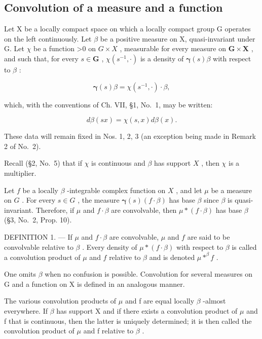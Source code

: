 \subsection{Convolution of a measure and a function}

Let X be a locally compact space on which a locally compact group G operates on the left continuously. Let \(\beta\) be a positive measure on X, quasi-invariant under G. Let \(\chi\) be a function \textgreater0 on \(G \times X\) , measurable for every measure on \(\mathbf{G} \times \mathbf{X}\) , and such that, for every \(s \in \mathbf{G}\) , \(\chi(s^{-1}, \cdot)\) is a density of \(\pmb{\gamma}(s)\beta\) with respect to \(\beta\) :

\[
\pmb {\gamma} (s) \beta = \chi (s ^ {- 1}, \cdot) \cdot \beta ,\tag{1}
\]

which, with the conventions of Ch. VII, §1, No.~1, may be written:

\[
d \beta (s x) = \chi (s, x) d \beta (x).\tag{1'}
\]

These data will remain fixed in Nos. 1, 2, 3 (an exception being made in Remark 2 of No.~2).

Recall (§2, No.~5) that if \(\chi\) is continuous and \(\beta\) has support \(X\) , then \(\chi\) is a multiplier.

Let \(f\) be a locally \(\beta\) -integrable complex function on \(X\) , and let \(\mu\) be a measure on \(G\) . For every \(s \in G\) , the measure \(\boldsymbol{\gamma}(s)(f \cdot \beta)\) has base \(\beta\) since \(\beta\) is quasi-invariant. Therefore, if \(\mu\) and \(f \cdot \beta\) are convolvable, then \(\mu * (f \cdot \beta)\) has base \(\beta\) (§3, No.~2, Prop. 10).

DEFINITION 1. --- If \(\mu\) and \(f \cdot \beta\) are convolvable, \(\mu\) and \(f\) are said to be convolvable relative to \(\beta\) . Every density of \(\mu * (f \cdot \beta)\) with respect to \(\beta\) is called a convolution product of \(\mu\) and \(f\) relative to \(\beta\) and is denoted \(\mu * ^{\beta} f\) .

One omits \(\beta\) when no confusion is possible. Convolution for several measures on G and a function on X is defined in an analogous manner.

The various convolution products of \(\mu\) and f are equal locally \(\beta\) -almost everywhere. If \(\beta\) has support X and if there exists a convolution product of \(\mu\) and f that is continuous, then the latter is uniquely determined; it is then called the convolution product of \(\mu\) and f relative to \(\beta\) .

